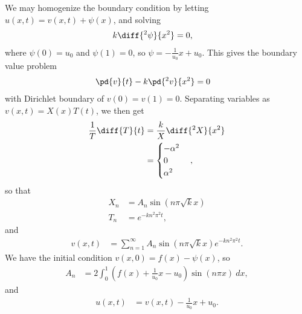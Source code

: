 \documentclass[10pt]{mypackage}
\begin{document}
\begin{solution}[12.6, Problem 2]
  We may homogenize the boundary condition by letting $u\left( x,t \right) = v\left( x,t \right) + \psi(x)$, and solving
  \begin{align*}
    k\diff{^2\psi}{x^2} &= 0,
  \end{align*}
  where $\psi(0) = u_0$ and $\psi(1) = 0$, so $\psi = -\frac{1}{u_0}x + u_0$. This gives the boundary value problem
  \begin{align*}
    \pd{v}{t} - k\pd{^2v}{x^2} &= 0
  \end{align*}
  with Dirichlet boundary of $v(0) = v(1) = 0$. Separating variables as $v\left( x,t \right) = X(x)T(t)$, we then get
  \begin{align*}
    \frac{1}{T}\diff{T}{t} &= \frac{k}{X}\diff{^2X}{x^2}\\
                           &= \begin{cases}
                             -\alpha^2\\
                             0\\
                             \alpha^2
                           \end{cases},
  \end{align*}
  so that
  \begin{align*}
    X_n &= A_n\sin\left( n\pi\sqrt{k}x \right)\\
    T_n &= e^{-kn^2\pi^2 t},
  \end{align*}
  and
  \begin{align*}
    v\left( x,t \right) &= \sum_{n=1}^{\infty}A_n\sin\left( n\pi\sqrt{k}x \right)e^{-kn^2\pi^2 t}.
  \end{align*}
  We have the initial condition $v\left( x,0 \right) = f(x)-\psi(x)$, so
  \begin{align*}
    A_n &= 2 \int_{0}^{1} \left( f(x)+\frac{1}{u_0}x-u_0 \right)\sin\left( n\pi x \right)\:dx,
  \end{align*}
  and
  \begin{align*}
    u\left( x,t \right) &= v\left( x,t \right)-\frac{1}{u_0}x + u_0.
  \end{align*}
\end{solution}
\end{document}

